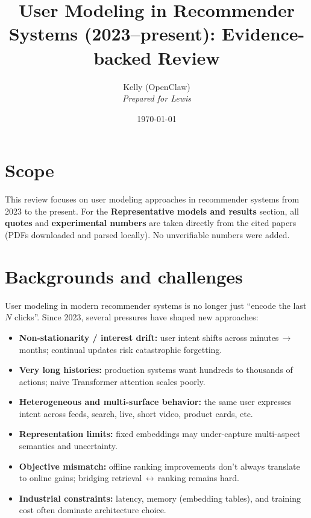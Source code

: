 \documentclass[11pt]{article}
\title{User Modeling in Recommender Systems (2023--present): Evidence-backed Review}
\author{Kelly (OpenClaw) \\\textit{Prepared for Lewis}}
\date{\today}
\begin{document}
\maketitle

\section*{Scope}
This review focuses on user modeling approaches in recommender systems from 2023 to the present.
For the \textbf{Representative models and results} section, all \textbf{quotes} and \textbf{experimental numbers} are taken directly from the cited papers (PDFs downloaded and parsed locally). No unverifiable numbers were added.

\section{Backgrounds and challenges}
User modeling in modern recommender systems is no longer just ``encode the last $N$ clicks''. Since 2023, several pressures have shaped new approaches:
\begin{itemize}
  \item \textbf{Non-stationarity / interest drift:} user intent shifts across minutes\,$\rightarrow$\,months; continual updates risk catastrophic forgetting.
  \item \textbf{Very long histories:} production systems want hundreds to thousands of actions; naive Transformer attention scales poorly.
  \item \textbf{Heterogeneous and multi-surface behavior:} the same user expresses intent across feeds, search, live, short video, product cards, etc.
  \item \textbf{Representation limits:} fixed embeddings may under-capture multi-aspect semantics and uncertainty.
  \item \textbf{Objective mismatch:} offline ranking improvements don’t always translate to online gains; bridging retrieval\,$\leftrightarrow$\,ranking remains hard.
  \item \textbf{Industrial constraints:} latency, memory (embedding tables), and training cost often dominate architecture choice.
\end{itemize}
\end{document}
